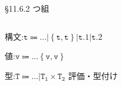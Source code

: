 \documentclass[9pt]{beamer}
\begin{document}
\begin{frame}{\S11.6.2 つ組}
\begin{columns}
\begin{column}{0.2\columnwidth}
    構文:$\mathtt{t\Coloneq\ldots|\left\{t, t\right\}|t.1|t.2}$

    値:$\mathtt{v\Coloneq\ldots\left\{v, v\right\}}$

    型:$\mathtt{T\Coloneq \ldots|T_{1}\times T_{2}}$
評価・型付け
\begin{prooftree}
    \end{prooftree}
    \begin{prooftree}
        \end{prooftree}
\end{column}
\begin{column}{0.75\columnwidth}
    \begin{prooftree}
    \end{prooftree}
    \begin{prooftree}
        \end{prooftree}
    \begin{prooftree}
    \end{prooftree}
    \begin{prooftree}
        \end{prooftree}
        \begin{prooftree}
        \end{prooftree}
        \begin{prooftree}
        \end{prooftree}
        \begin{prooftree}
            \end{prooftree}
\end{column}
\end{columns}
\end{frame}
\end{document}
